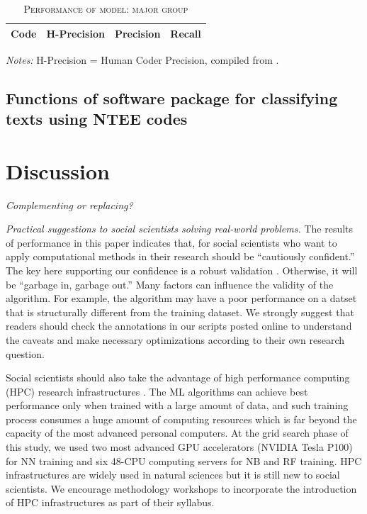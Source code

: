 \documentclass[11pt]{article}
\begin{document}
\begin{table}
\centering
\begin{threeparttable}
    \caption{\textsc{Performance of model: major group}} \label{tab:perf_mg}
    \begin{tabular}{r|r|r|r}
		\hline
			Code & H-Precision & Precision & Recall \\
		\hline

         \hline
    \end{tabular}
\begin{tablenotes}
\footnotesize
\item \emph{Notes:} H-Precision = Human Coder Precision, compiled from \textcite[153]{StengelGettingItRight1998}.
\end{tablenotes}
\end{threeparttable}
\end{table}







\subsection{Functions of software package for classifying texts using NTEE codes}




\section{Discussion}


\textit{Complementing or replacing?}


\textit{Practical suggestions to social scientists solving real-world problems.} The results of performance in this paper indicates that, for social scientists who want to apply computational methods in their research should be ``cautiously confident.'' The key here supporting our confidence is a robust validation \parencite[271]{GrimmerTextDataPromise2013}. Otherwise, it will be ``garbage in, garbage out.'' Many factors can influence the validity of the algorithm. For example, the algorithm may have a poor performance on a datset that is structurally different from the training dataset. We strongly suggest that readers should check the annotations in our scripts posted online to understand the caveats and make necessary optimizations according to their own research question.

Social scientists should also take the advantage of high performance computing (HPC) research infrastructures \parencite[e.g.,][]{KeaheyChameleonScalableProduction2018}. The ML algorithms can achieve best performance only when trained with a large amount of data, and such training process consumes a huge amount of computing resources which is far beyond the capacity of the most advanced personal computers. At the grid search phase of this study, we used two most advanced GPU accelerators (NVIDIA Tesla P100) for NN training and six 48-CPU computing servers for NB and RF training. HPC infrastructures are widely used in natural sciences but it is still new to social scientists. We encourage methodology workshops to incorporate the introduction of HPC infrastructures as part of their syllabus.
\end{document}
